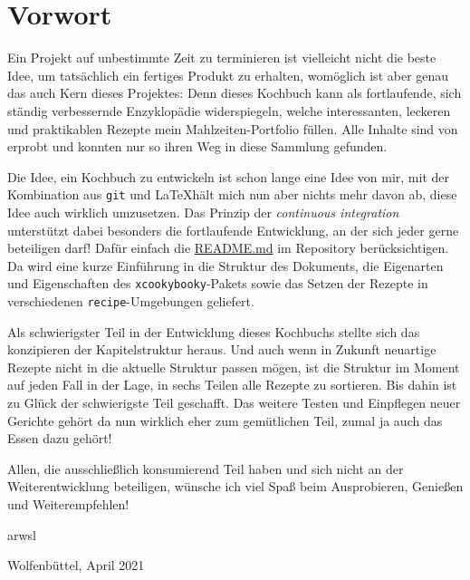 \thispagestyle{empty}
\setcounter{page}{0}

\section*{Vorwort}
\label{sec:Vorwort}

Ein Projekt auf unbestimmte Zeit zu terminieren ist vielleicht nicht die beste Idee, um tatsächlich ein fertiges Produkt zu erhalten, womöglich ist aber genau das auch Kern dieses Projektes: Denn dieses Kochbuch kann als fortlaufende, sich ständig verbessernde Enzyklopädie widerspiegeln, welche interessanten, leckeren und praktikablen Rezepte mein Mahlzeiten-Portfolio füllen. Alle Inhalte sind von erprobt und konnten nur so ihren Weg in diese Sammlung gefunden.

Die Idee, ein Kochbuch zu entwickeln ist schon lange eine Idee von mir, mit der Kombination aus \texttt{git} und \LaTeX\:hält mich nun aber nichts mehr davon ab, diese Idee auch wirklich umzusetzen. Das Prinzip der \emph{continuous integration} unterstützt dabei besonders die fortlaufende Entwicklung, an der sich jeder gerne beteiligen darf! Dafür einfach die \href{https://github.com/arwsl/Bronte-Project}{README.md} im Repository berücksichtigen. Da wird eine kurze Einführung in die Struktur des Dokuments, die Eigenarten und Eigenschaften des \texttt{xcookybooky}-Pakets sowie das Setzen der Rezepte in verschiedenen \texttt{recipe}-Umgebungen geliefert.

Als schwierigster Teil in der Entwicklung dieses Kochbuchs stellte sich das konzipieren der Kapitelstruktur heraus. Und auch wenn in Zukunft neuartige Rezepte nicht in die aktuelle Struktur passen mögen, ist die Struktur im Moment auf jeden Fall in der Lage, in sechs Teilen alle Rezepte zu sortieren. Bis dahin ist zu Glück der schwierigste Teil geschafft. Das weitere Testen und Einpflegen neuer Gerichte gehört da nun wirklich eher zum gemütlichen Teil, zumal ja auch das Essen dazu gehört!

Allen, die ausschließlich konsumierend Teil haben und sich nicht an der Weiterentwicklung beteiligen, wünsche ich viel Spaß beim Ausprobieren, Genießen und Weiterempfehlen!

\vspace{1.5cm}
\hspace{1cm} arwsl
\begin{flushright}
	\hfill Wolfenbüttel, April 2021
\end{flushright}



\clearpage

